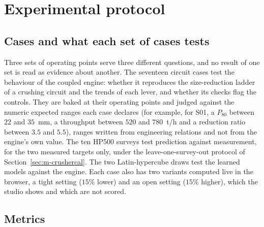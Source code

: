 \section{Experimental protocol}\label{sec:protocol}

\subsection{Cases and what each set of cases tests}\label{sec:protocol-cases}

Three sets of operating points serve three different questions, and no result of one set is read as evidence about another. The
seventeen circuit cases test the behaviour of the coupled engine: whether it reproduces the size-reduction ladder of a crushing circuit
and the trends of each lever, and whether its checks flag the controls. They are baked at their operating points and judged against the
numeric expected ranges each case declares (for example, for S01, a $P_{80}$ between $22$ and $35$~mm, a throughput between $520$ and
$780$~t/h and a reduction ratio between $3.5$ and $5.5$), ranges written from engineering relations and not from the engine's own value.
The ten HP500 surveys test prediction against measurement, for the two measured targets only, under the leave-one-survey-out protocol of
Section~\ref{sec:m-crushercal}. The two Latin-hypercube draws test the learned models against the engine. Each case also has two
variants computed live in the browser, a tight setting ($15\%$ lower) and an open setting ($15\%$ higher), which the studio shows and which
are not scored.

\subsection{Metrics}\label{sec:protocol-metrics}

